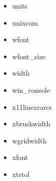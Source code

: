 {\begin{multicols}{3}
\begin{itemize}[leftmargin=0pt,label={}]
    \item units
    \item unixcom
    \item wfont
    \item wfont\_size
    \item width
    \item win\_console
    \item x11lineararcs
    \item xbrushwidth
    \item wgridwidth
    \item xfont
    \item xtrtol
\end{itemize}\end{multicols}}
